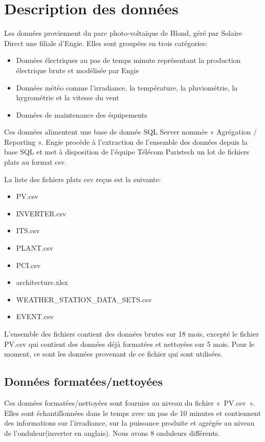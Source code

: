 \chapter{Description des données}

Les données proviennent du parc photo-voltaïque de Blond, géré par Solaire Direct une filiale d'Engie.
Elles sont groupées en trois catégories:
\begin{itemize}
\item Données électriques au pas de temps minute représentant la production électrique brute et modélisée par Engie
\item Données météo comme l'irradiance, la température, la pluviométrie, la hygrométrie et la vitesse du vent
\item Données de maintenance des équipements
\end{itemize}

Ces données alimentent une base de donnée SQL Server nommée « Agrégation / Reporting ».
Engie procède à l'extraction de l'ensemble des données depuis la base SQL et met à disposition de l'équipe Télécom Paristech un lot de fichiers plats au format csv.

La liste des fichiers plats csv reçus est la suivante:
\begin{itemize}
\item PV.csv
\item INVERTER.csv
\item ITS.csv
\item PLANT.csv
\item PCI.csv
\item architecture.xlsx
\item WEATHER\_STATION\_DATA\_SETS.csv
\item EVENT.csv
\end{itemize}

L'ensemble des fichiers contient des données brutes sur 18 mois, excepté le fichier PV.csv qui contient des données déjà formatées et nettoyées sur 5 mois.
Pour le moment, ce sont les données provenant de ce fichier qui sont utilisées.


\section{Données formatées/nettoyées}

Ces données formatées/nettoyées sont fournies au niveau du fichier « PV.csv ». Elles sont échantillonnées dans le temps avec un pas de 10 minutes et contiennent des informations sur l'irradiance, sur la puissance produite et agrégée au niveau de l'onduleur(inverter en anglais).
Nous avons 8 onduleurs différents.


